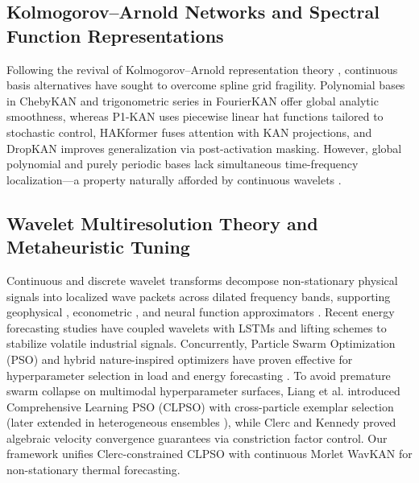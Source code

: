 \documentclass[pdflatex,sn-mathphys-num,referee,lineno]{sn-jnl}
\theoremstyle{thmstyleone}
\theoremstyle{thmstyletwo}
\theoremstyle{thmstylethree}
\begin{document}
\subsection{Kolmogorov--Arnold Networks and Spectral Function Representations}\label{subsec:rw_kan}
Following the revival of Kolmogorov--Arnold representation theory \cite{kolmogorov1957representation, arnold1957representation, liu2024kan}, continuous basis alternatives have sought to overcome spline grid fragility. Polynomial bases in ChebyKAN \cite{sidharth2024chebykan} and trigonometric series in FourierKAN \cite{xu2024fourierkan} offer global analytic smoothness, whereas P1-KAN \cite{warin2026p1kan} uses piecewise linear hat functions tailored to stochastic control, HAKformer \cite{lv2026hakformer} fuses attention with KAN projections, and DropKAN \cite{altarabichi2024dropkan} improves generalization via post-activation masking. However, global polynomial and purely periodic bases lack simultaneous time-frequency localization---a property naturally afforded by continuous wavelets \cite{grossmann1984decomposition, bozorgasl2024wavkan}.

\subsection{Wavelet Multiresolution Theory and Metaheuristic Tuning}\label{subsec:rw_wavelets_pso}
Continuous and discrete wavelet transforms \cite{daubechies1988orthonormal, mallat1989wavelet, daubechies1992ten, farge1992wavelet} decompose non-stationary physical signals into localized wave packets across dilated frequency bands, supporting geophysical \cite{torrence1998practical}, econometric \cite{percival2000wavelet}, and neural function approximators \cite{zhang1992waveletnet, pati1993discreteaffine}. Recent energy forecasting studies have coupled wavelets with LSTMs \cite{tamilselvi2025waveletlstm} and lifting schemes \cite{bezerra2024forecasting} to stabilize volatile industrial signals. Concurrently, Particle Swarm Optimization (PSO) \cite{kennedy1995pso, shi1998modifiedpso, poli2007psooverview, sengupta2018psosurvey} and hybrid nature-inspired optimizers \cite{mirjalili2015mothflame, zhan2009adaptivepso} have proven effective for hyperparameter selection in load and energy forecasting \cite{cao2021energypso, shang2021psolstm, li2021psosvr, yang2025acklstm}. To avoid premature swarm collapse on multimodal hyperparameter surfaces, Liang et al. \cite{liang2006clpso} introduced Comprehensive Learning PSO (CLPSO) with cross-particle exemplar selection (later extended in heterogeneous ensembles \cite{lynn2015clpsoensemble}), while Clerc and Kennedy \cite{clerc2002constriction} proved algebraic velocity convergence guarantees via constriction factor control. Our framework unifies Clerc-constrained CLPSO with continuous Morlet WavKAN for non-stationary thermal forecasting.
\end{document}
